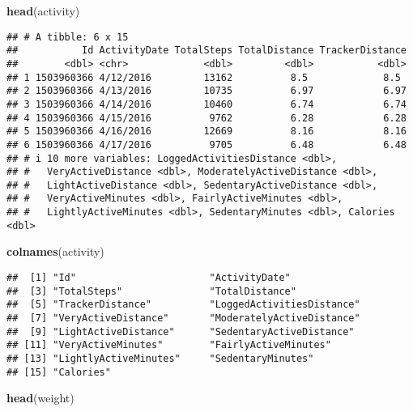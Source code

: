 \documentclass[
]{article}
\newenvironment{Shaded}{\begin{snugshade}}{\end{snugshade}}
\newcommand{\FunctionTok}[1]{\textcolor[rgb]{0.13,0.29,0.53}{\textbf{#1}}}
\newcommand{\NormalTok}[1]{#1}
\begin{document}
\begin{Shaded}
\begin{Highlighting}[]
\FunctionTok{head}\NormalTok{(activity)}
\end{Highlighting}
\end{Shaded}

\begin{verbatim}
## # A tibble: 6 x 15
##           Id ActivityDate TotalSteps TotalDistance TrackerDistance
##        <dbl> <chr>             <dbl>         <dbl>           <dbl>
## 1 1503960366 4/12/2016         13162          8.5             8.5 
## 2 1503960366 4/13/2016         10735          6.97            6.97
## 3 1503960366 4/14/2016         10460          6.74            6.74
## 4 1503960366 4/15/2016          9762          6.28            6.28
## 5 1503960366 4/16/2016         12669          8.16            8.16
## 6 1503960366 4/17/2016          9705          6.48            6.48
## # i 10 more variables: LoggedActivitiesDistance <dbl>,
## #   VeryActiveDistance <dbl>, ModeratelyActiveDistance <dbl>,
## #   LightActiveDistance <dbl>, SedentaryActiveDistance <dbl>,
## #   VeryActiveMinutes <dbl>, FairlyActiveMinutes <dbl>,
## #   LightlyActiveMinutes <dbl>, SedentaryMinutes <dbl>, Calories <dbl>
\end{verbatim}

\begin{Shaded}
\begin{Highlighting}[]
\FunctionTok{colnames}\NormalTok{(activity)}
\end{Highlighting}
\end{Shaded}

\begin{verbatim}
##  [1] "Id"                       "ActivityDate"            
##  [3] "TotalSteps"               "TotalDistance"           
##  [5] "TrackerDistance"          "LoggedActivitiesDistance"
##  [7] "VeryActiveDistance"       "ModeratelyActiveDistance"
##  [9] "LightActiveDistance"      "SedentaryActiveDistance" 
## [11] "VeryActiveMinutes"        "FairlyActiveMinutes"     
## [13] "LightlyActiveMinutes"     "SedentaryMinutes"        
## [15] "Calories"
\end{verbatim}

\begin{Shaded}
\begin{Highlighting}[]
\FunctionTok{head}\NormalTok{(weight)}
\end{Highlighting}
\end{Shaded}
\end{document}
